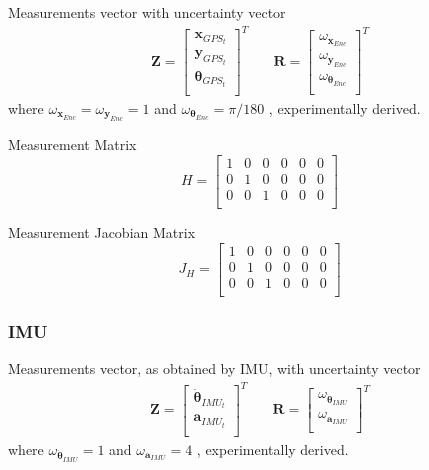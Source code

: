 Measurements vector with uncertainty vector
\begin{align}
\mathbf{Z}
=
\begin{bmatrix}
\mathbf{x}_{GPS_t} \\
\mathbf{y}_{GPS_t} \\
\boldsymbol \theta_{GPS_t} \\
\end{bmatrix}^T
& \quad
\mathbf{R}
=
\begin{bmatrix}
\omega_{\mathbf{x}_{Enc}} \\
\omega_{\mathbf{y}_{Enc}} \\
\omega_{\boldsymbol \theta_{Enc}} \\
\end{bmatrix}^T
\end{align}
where $ \omega_{\mathbf{x}_{Enc}} = \omega_{\mathbf{y}_{Enc}} = 1$ and
$ \omega_{\boldsymbol \theta_{Enc}} = \pi/180 $ , experimentally derived.


Measurement Matrix
\begin{equation}
H
=
\begin{bmatrix}
1 & 0 & 0 & 0 & 0 & 0 \\
0 & 1 & 0 & 0 & 0 & 0 \\
0 & 0 & 1 & 0 & 0 & 0 \\
\end{bmatrix}
\end{equation}

Measurement Jacobian Matrix
\begin{equation}
J_H
=
\begin{bmatrix}
1 & 0 & 0 & 0 & 0 & 0 \\
0 & 1 & 0 & 0 & 0 & 0 \\
0 & 0 & 1 & 0 & 0 & 0 \\
\end{bmatrix}
\end{equation}


\subsubsection{IMU}

Measurements vector, as obtained by IMU, with uncertainty vector
\begin{align}
\mathbf{Z}
=
\begin{bmatrix}
\dot{\boldsymbol \theta }_{IMU_t} \\
\mathbf{a}_{IMU_t} \\
\end{bmatrix}^T
& \quad
\mathbf{R}
=
\begin{bmatrix}
\omega_{\dot{\boldsymbol \theta}_{IMU}} \\
\omega_{\mathbf{a}_{IMU}} \\
\end{bmatrix}^T
\end{align}
where $ \omega_{\dot{\boldsymbol \theta}_{IMU}} = 1$ and
$ \omega_{\mathbf{a}_{IMU}} = 4 $ , experimentally derived.



